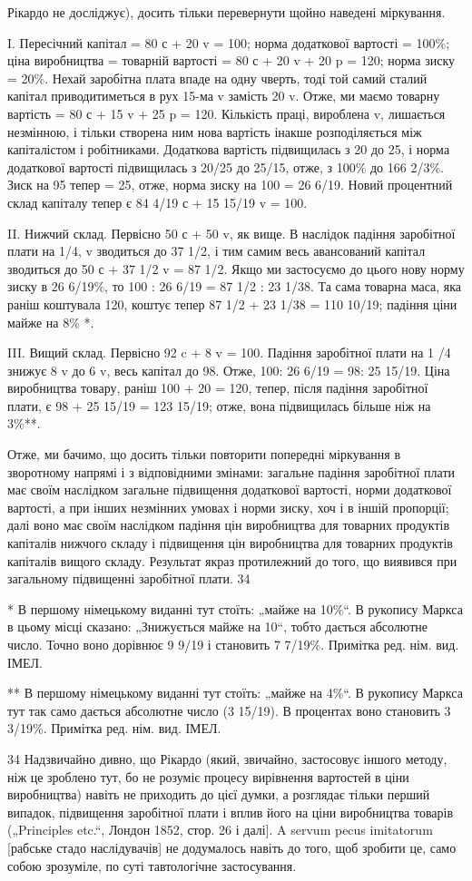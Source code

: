 Рікардо не досліджує), досить тільки перевернути щойно наведені
міркування.

I. Пересічний капітал = 80 с + 20 v = 100; норма додаткової
вартості = 100\%; ціна виробництва = товарній вартості = 80 с +
20 v + 20 p = 120; норма зиску = 20\%. Нехай заробітна плата
впаде на одну чверть, тоді той самий сталий капітал приводитиметься
в рух 15-ма v замість 20 v. Отже, ми маємо товарну
вартість = 80 с + 15 v + 25 p = 120. Кількість праці, вироблена v,
лишається  незмінною, і тільки створена ним нова вартість інакше
розподіляється між капіталістом і робітниками. Додаткова вартість
підвищилась з 20 до 25, і норма додаткової вартості
підвищилась з 20/25 до 25/15, отже, з 100\% до 166 2/3\%. Зиск на 95 тепер = 25,
отже, норма зиску на 100 = 26 6/19. Новий процентний склад
капіталу тепер є 84 4/19 с + 15 15/19 v = 100.

II. Нижчий склад. Первісно 50 с + 50 v, як вище. В наслідок
падіння заробітної плати на 1/4, v зводиться до 37 1/2, і тим самим
весь авансований капітал зводиться до 50 с + 37 1/2 v = 87 1/2. Якщо
ми застосуємо до цього нову норму зиску в 26 6/19\%, то
100 : 26 6/19 = 87 1/2 : 23 1/38. Та сама товарна маса, яка раніш коштувала
120, коштує тепер 87 1/2 + 23 1/38 = 110 10/19; падіння ціни майже на 8\% *.

III. Вищий склад. Первісно 92 c + 8 v = 100. Падіння заробітної
плати на 1 /4 знижує 8 v до 6 v, весь капітал до 98. Отже,
100: 26 6/19 = 98: 25 15/19. Ціна виробництва товару, раніш 100 + 20 = 120,
тепер, після падіння заробітної плати, є 98 + 25 15/19 = 123 15/19;
отже, вона підвищилась більше ніж на 3\%**.

Отже, ми бачимо, що досить тільки повторити попередні міркування в зворотному напрямі і з
відповідними змінами: загальне падіння заробітної плати має своїм наслідком загальне підвищення
додаткової вартості, норми додаткової вартості, а при інших незмінних умовах і норми зиску, хоч і в
іншій пропорції; далі воно має своїм наслідком падіння цін виробництва для товарних продуктів
капіталів нижчого складу і підвищення цін виробництва для товарних продуктів капіталів вищого
складу. Результат якраз протилежний до того, що  виявився при загальному підвищенні заробітної
плати. 34

* В першому німецькому виданні тут стоїть: „майже на 10\%“. В рукопису
Маркса в цьому місці сказано: „Знижується майже на 10“, тобто дається абсолютне число. Точно воно
дорівнює 9 9/19 і становить 7 7/19\%. Примітка ред. нім. вид. ІМЕЛ.

** В першому німецькому виданні тут стоїть: „майже на 4\%“. В рукопису
Маркса тут так само дається абсолютне число (3 15/19). В процентах воно становить
3 3/19\%. Примітка ред. нім. вид. ІМЕЛ.

34 Надзвичайно дивно, що Рікардо (який, звичайно, застосовує іншого
методу, ніж це зроблено тут, бо не розуміє процесу вирівнення вартостей в ціни виробництва) навіть
не приходить до цієї думки, а розглядає тільки перший випадок, підвищення заробітної плати і вплив
його на ціни виробництва товарів („Principles etc.“, Лондон 1852, стор. 26 і далі]. A servum pecus
imitatorum [рабське стадо наслідувачів] не додумалось навіть до того, щоб зробити
це, само собою зрозуміле, по суті тавтологічне застосування.
